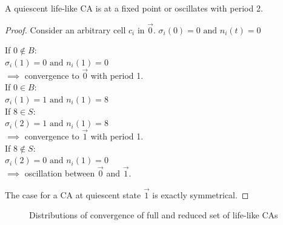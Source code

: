 \begin{lemma}
A quiescent life-like CA is at a fixed point or oscillates with period 2.   
\end{lemma}

\begin{proof} \label{quiescent-nullity}
Consider an arbitrary cell $c_i$ in $\vec{0}$. $\sigma_i(0) = 0 \text{\ and\ } n_i(t) = 0$\\
\begin{multicols}{2}
\noindent If $0 \notin B$:\\
\null \quad $\sigma_i(1) = 0 \text{\ and\ } n_i(1) = 0 $\\
\null \quad $\implies$ convergence to $\vec{0}$ with period 1.\\
\columnbreak\linebreak
\noindent If $0 \in B$:\\
\null \quad $\sigma_i(1) = 1 \text{\ and\ } n_i(1) = 8 $\\
\null \quad If $8 \in S$:\\
\null \qquad $\sigma_i(2) = 1 \text{\ and\ } n_i(1) = 8 $\\
\null \qquad $\implies$ convergence to $\vec{1}$ with period 1.\\
\null \quad If $8 \notin S$:\\
\null \qquad $\sigma_i(2) = 0 \text{\ and\ } n_i(1) = 0 $\\
\null \qquad $\implies$ oscillation between $\vec{0}$ and $\vec{1}$.
\end{multicols}
\noindent The case for a CA at quiescent state $\vec{1}$ is exactly symmetrical.
\end{proof}

\begin{figure}[!h]
\centering
            \hfill
            \hfill
            \caption{Distributions of convergence of full and reduced set of life-like CAs}
\label{fig:taxonomy-dist}
\end{figure}

